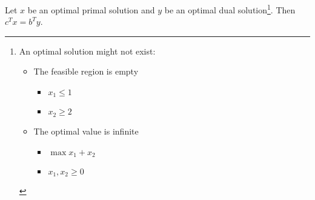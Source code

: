 	\begin{thm}
		Let $x$ be an optimal primal solution and $y$ be an optimal dual solution\footnote{An optimal solution might not exist: \begin{itemize}
			\item The feasible region is empty
			\begin{itemize}
				\item $x_1 \leq 1$
				\item $x_2 \geq 2$
			\end{itemize}
			\item The optimal value is infinite
			\begin{itemize}
				\item $\max x_1 + x_2$
				\item $x_1, x_2 \geq 0$
			\end{itemize}
		\end{itemize}}. Then $c^Tx = b^Ty$.
	\end{thm}

